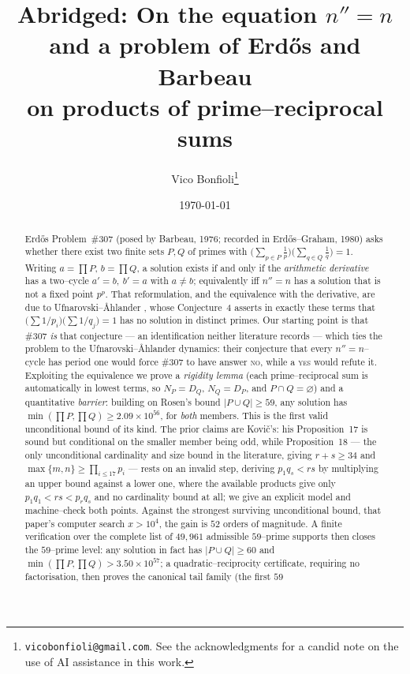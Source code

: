 \documentclass[11pt]{article}
\title{Abridged: On the equation $n''=n$ and a problem of Erd\H{o}s and Barbeau \\
       on products of prime--reciprocal sums}
\author{Vico Bonfioli\thanks{\texttt{vicobonfioli@gmail.com}.
  See the acknowledgments for a candid note on the use of AI assistance in this work.}}
\date{\today}
\theoremstyle{definition}
\begin{document}
\maketitle

\begin{abstract}
Erd\H{o}s Problem~\#307 (posed by Barbeau, 1976; recorded in Erd\H{o}s--Graham, 1980) asks
whether there exist two finite sets $P,Q$ of primes with
$\bigl(\sum_{p\in P}\tfrac1p\bigr)\bigl(\sum_{q\in Q}\tfrac1q\bigr)=1$.
Writing $a=\prod P$, $b=\prod Q$, a solution exists if and only if the \emph{arithmetic derivative}
has a two--cycle $a'=b,\ b'=a$ with $a\neq b$; equivalently iff $n''=n$ has a solution that is not a
fixed point $p^{p}$. That reformulation, and the equivalence with the derivative, are due to
Ufnarovski--\AA hlander \cite{UfnarovskiAhlander2003}, whose Conjecture~4 asserts in exactly these
terms that $\bigl(\sum1/p_i\bigr)\bigl(\sum1/q_j\bigr)=1$ has no solution in distinct primes. Our
starting point is that \#307 \emph{is} that conjecture --- an identification neither literature
records --- which ties the problem to the Ufnarovski--\AA hlander dynamics: their conjecture that
every $n''=n$--cycle has period one would force \#307 to have answer \textsc{no}, while a
\textsc{yes} would refute it. Exploiting the equivalence we prove a \emph{rigidity lemma} (each prime--reciprocal
sum is automatically in lowest terms, so $N_P=D_Q$, $N_Q=D_P$, and $P\cap Q=\varnothing$) and a
quantitative \emph{barrier}: building on Rosen's bound $|P\cup Q|\ge 59$, any solution has
$\min(\prod P,\prod Q)\ge 2.09\times10^{56}$, for \emph{both} members. This is the first valid
unconditional bound of its kind. The prior claims are Kovi\v{c}'s: his Proposition~17 is sound but
conditional on the smaller member being odd, while Proposition~18 --- the only unconditional
cardinality and size bound in the literature, giving $r+s\ge34$ and
$\max\{m,n\}\ge\prod_{i\le17}p_i$ --- rests on an invalid step, deriving $p_1q_s<rs$ by multiplying
an upper bound against a lower one, where the available products give only $p_1q_1<rs<p_rq_s$ and no
cardinality bound at all; we give an explicit model and machine--check both points. Against the
strongest surviving unconditional bound, that paper's computer search $x>10^4$, the gain is $52$
orders of magnitude. A finite verification over the complete list of
$49{,}961$ admissible $59$--prime supports then closes the $59$--prime level: any solution in fact
has $|P\cup Q|\ge 60$ and $\min(\prod P,\prod Q)>3.50\times10^{57}$; a quadratic--reciprocity
certificate, requiring no factorisation, then proves the canonical tail family (the first $59$

\end{abstract}
\end{document}
